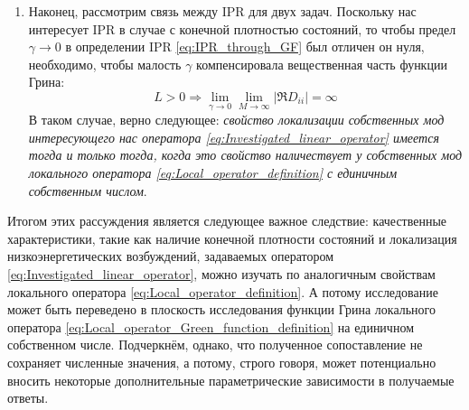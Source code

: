 \begin{enumerate}
	\item Наконец, рассмотрим связь между IPR для двух задач. Поскольку нас интересует IPR в случае с конечной плотностью состояний, то чтобы предел $\gamma \rightarrow 0$ в определении IPR \eqref{eq:IPR_through_GF} был отличен он нуля, необходимо, чтобы малость $\gamma$ компенсировала вещественная часть функции Грина:
	\begin{equation}
		\label{eq:Condition_on_GF_real_part_for_localized_states}
		L > 0 \Rightarrow \lim_{\gamma \rightarrow 0} \lim_{M \rightarrow \infty} \left| \Re D_{ii} \right| = \infty
	\end{equation}
	В таком случае, верно следующее: \textit{свойство локализации собственных мод интересующего нас оператора \eqref{eq:Investigated_linear_operator} имеется тогда и только тогда, когда это свойство наличествует у собственных мод локального оператора \eqref{eq:Local_operator_definition} с единичным собственным числом}.
\end{enumerate}
Итогом этих рассуждения является следующее важное следствие: качественные характеристики, такие как наличие конечной плотности состояний и локализация низкоэнергетических возбуждений, задаваемых оператором \eqref{eq:Investigated_linear_operator}, можно изучать по аналогичным свойствам локального оператора \eqref{eq:Local_operator_definition}. А потому исследование может быть переведено в плоскость исследования функции Грина локального оператора \eqref{eq:Local_operator_Green_function_definition} на единичном собственном числе. 
Подчеркнём, однако, что полученное сопоставление не сохраняет численные значения, а потому, строго говоря, может потенциально вносить некоторые дополнительные параметрические зависимости в получаемые ответы.


